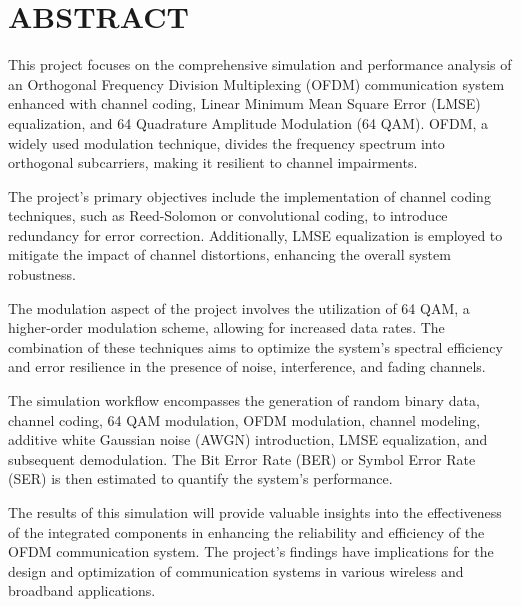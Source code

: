 \section*{ABSTRACT}
This project focuses on the comprehensive simulation and performance analysis of an Orthogonal Frequency Division Multiplexing (OFDM) communication system enhanced with channel coding, Linear Minimum Mean Square Error (LMSE) equalization, and 64 Quadrature Amplitude Modulation (64 QAM). OFDM, a widely used modulation technique, divides the frequency spectrum into orthogonal subcarriers, making it resilient to channel impairments.

The project's primary objectives include the implementation of channel coding techniques, such as Reed-Solomon or convolutional coding, to introduce redundancy for error correction. Additionally, LMSE equalization is employed to mitigate the impact of channel distortions, enhancing the overall system robustness.

The modulation aspect of the project involves the utilization of 64 QAM, a higher-order modulation scheme, allowing for increased data rates. The combination of these techniques aims to optimize the system's spectral efficiency and error resilience in the presence of noise, interference, and fading channels.

The simulation workflow encompasses the generation of random binary data, channel coding, 64 QAM modulation, OFDM modulation, channel modeling, additive white Gaussian noise (AWGN) introduction, LMSE equalization, and subsequent demodulation. The Bit Error Rate (BER) or Symbol Error Rate (SER) is then estimated to quantify the system's performance.

The results of this simulation will provide valuable insights into the effectiveness of the integrated components in enhancing the reliability and efficiency of the OFDM communication system. The project's findings have implications for the design and optimization of communication systems in various wireless and broadband applications.
\newpage
\cleardoublepage